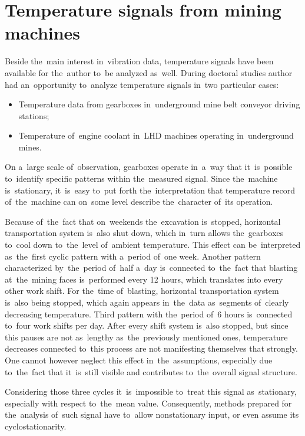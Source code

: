 \clearpage
\section{Temperature signals from mining machines}

Beside the~main interest in~vibration data, temperature signals have been available for the~author to~be analyzed as~well. During doctoral studies author had an~opportunity to~analyze temperature signals in~two particular cases:

\begin{itemize}
	\item Temperature data from gearboxes in~underground mine belt conveyor driving stations;
	\item Temperature of~engine coolant in~LHD machines operating in~underground mines.
\end{itemize}

On a~large scale of~observation, gearboxes operate in~a~way that it~is~possible to~identify specific patterns within the~measured signal. Since the~machine is~stationary, it~is~easy to~put forth the~interpretation that temperature record of~the~machine can on~some level describe the~character of~its operation. 

Because of~the~fact that on~weekends the~excavation is~stopped, horizontal transportation system is~also shut down, which in~turn allows the~gearboxes to~cool down to~the~level of~ambient temperature. This effect can be~interpreted as~the~first cyclic pattern with a~period of~one week. Another pattern characterized by~the~period of~half a~day is~connected to~the~fact that blasting at~the~mining faces is~performed every 12 hours, which translates into every other work shift. For the~time of~blasting, horizontal transportation system is~also being stopped, which again appears in~the~data as~segments of~clearly decreasing temperature. Third pattern with the~period of~6 hours is~connected to~four work shifts per day. After every shift system is~also stopped, but since this pauses are not as~lengthy as~the~previously mentioned ones, temperature decreases connected to~this process are not manifesting themselves that strongly. One cannot however neglect this effect in~the~assumptions, especially due to~the~fact that it~is~still visible and contributes to~the~overall signal structure.

Considering those three cycles it~is~impossible to~treat this signal as~stationary, especially with respect to~the~mean value. Consequently, methods prepared for the~analysis of~such signal have to~allow nonstationary input, or even assume its cyclostationarity.

